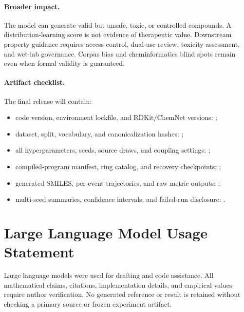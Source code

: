 \documentclass{article}
\theoremstyle{definition}
\theoremstyle{remark}
\begin{document}
\paragraph{Broader impact.}
The model can generate valid but unsafe, toxic, or controlled compounds. A distribution-learning score is not evidence of therapeutic value. Downstream property guidance requires access control, dual-use review, toxicity assessment, and wet-lab governance. Corpus bias and cheminformatics blind spots remain even when formal validity is guaranteed.

\paragraph{Artifact checklist.}
The final release will contain:
\begin{itemize}[leftmargin=*]
    \item code version, environment lockfile, and RDKit/ChemNet versions: \XXX;
    \item dataset, split, vocabulary, and canonicalization hashes: \XXX;
    \item all hyperparameters, seeds, source draws, and coupling settings: \XXX;
    \item compiled-program manifest, ring catalog, and recovery checkpoints: \XXX;
    \item generated SMILES, per-event trajectories, and raw metric outputs: \XXX;
    \item multi-seed summaries, confidence intervals, and failed-run disclosure: \XXX.
\end{itemize}

\section{Large Language Model Usage Statement}

Large language models were used for drafting and code assistance. All mathematical claims, citations, implementation details, and empirical values require author verification. No generated reference or result is retained without checking a primary source or frozen experiment artifact.
\end{document}
